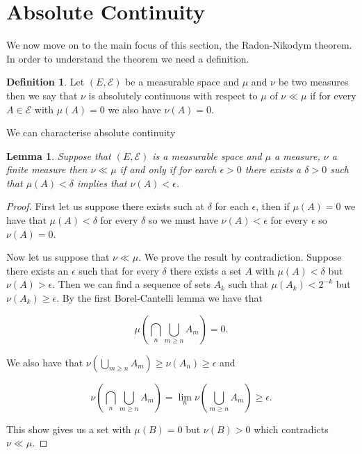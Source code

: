 \documentclass[
]{book}
\newtheorem{lemma}{Lemma}[chapter]
\theoremstyle{definition}
\newtheorem{definition}{Definition}[chapter]
\theoremstyle{definition}
\theoremstyle{definition}
\theoremstyle{definition}
\theoremstyle{remark}
\begin{document}
\hypertarget{absolute-continuity}{%
\section{Absolute Continuity}\label{absolute-continuity}}

We now move on to the main focus of this section, the Radon-Nikodym theorem. In order to understand the theorem we need a definition.

\begin{definition}
Let \((E, \mathcal{E})\) be a measurable space and \(\mu\) and \(\nu\) be two measures then we say that \(\nu\) is absolutely continuous with respect to \(\mu\) of \(\nu \ll \mu\) if for every \(A \in \mathcal{E}\) with \(\mu(A) = 0\) we also have \(\nu(A) = 0\).
\end{definition}

We can characterise absolute continuity

\begin{lemma}
Suppose that \((E, \mathcal{E})\) is a measurable space and \(\mu\) a measure, \(\nu\) a finite measure then \(\nu \ll \mu\) if and only if for earch \(\epsilon >0\) there exists a \(\delta>0\) such that \(\mu(A) < \delta\) implies that \(\nu(A) < \epsilon\).
\end{lemma}

\begin{proof}
First let us suppose there exists such at \(\delta\) for each \(\epsilon\), then if \(\mu(A) = 0\) we have that \(\mu(A)< \delta\) for every \(\delta\) so we must have \(\nu(A) < \epsilon\) for every \(\epsilon\) so \(\nu(A) =0\).

Now let us suppose that \(\nu \ll \mu\). We prove the result by contradiction. Suppose there exists an \(\epsilon\) such that for every \(\delta\) there exists a set \(A\) with \(\mu(A)< \delta\) but \(\nu(A) >\epsilon\). Then we can find a sequence of sets \(A_k\) such that \(\mu(A_k) < 2^{-k}\) but \(\nu(A_k) \geq \epsilon\). By the first Borel-Cantelli lemma we have that

\[ \mu \left( \bigcap_n \bigcup_{m \geq n} A_m \right) = 0. \]

We also have that \(\nu(\bigcup_{m \geq n} A_m) \geq \nu(A_n) \geq \epsilon\) and

\[\nu \left( \bigcap_n \bigcup_{m \geq n} A_m\right) = \lim_n \nu \left( \bigcup_{m \geq n} A_m \right) \geq \epsilon. \]

This show gives us a set with \(\mu(B) = 0\) but \(\nu(B) > 0\) which contradicts \(\nu \ll \mu\).
\end{proof}
\end{document}
